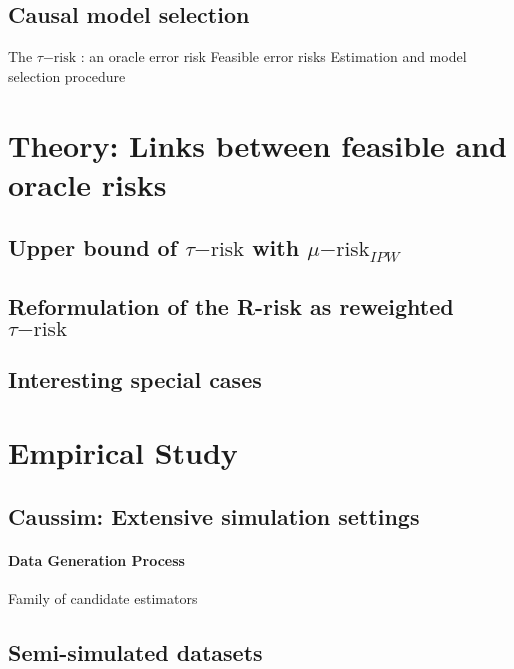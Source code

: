 \documentclass{report}
\begin{document}
\subsection{Causal model selection}\label{subsec:causal_model_selection:causal_model_selection}

The $\tau\mathrm{-risk}$ : an oracle error risk
Feasible error risks
Estimation and model selection procedure
\section{Theory: Links between feasible and oracle risks}\label{sec:causal_model_selection:theory}

\subsection{Upper bound of $\tau\mathrm{-risk}$ with
  $\mu\mathrm{-risk}_{IPW}$}\label{subsec:causal_model_selection:upper_bound}

\subsection{Reformulation of the R-risk as reweighted
  $\tau\mathrm{-risk}$}\label{subsec:causal_model_selection:r_risk_reformulation}

\subsection{Interesting special
  cases}\label{subsec:causal_model_selection:special_cases}

\section{Empirical Study}\label{sec:causal_model_selection:empirical_study}

\subsection{Caussim: Extensive simulation settings}\label{subsec:causal_model_selection:caussim}
\paragraph{Data Generation Process}

Family of candidate estimators

\subsection{Semi-simulated datasets}\label{subsec:causal_model_selection:semi_simulated}
\end{document}
